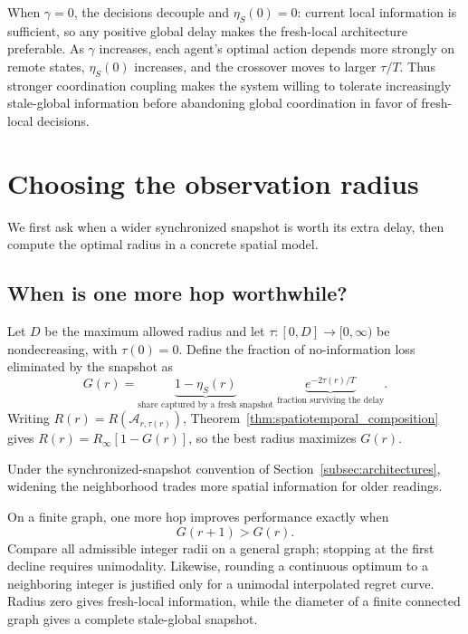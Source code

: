 \documentclass[11pt]{article}
\begin{document}
When $\gamma=0$, the decisions decouple and
$\eta_S(0)=0$: current local information is sufficient, so any
positive global delay makes the fresh-local architecture preferable. As $\gamma$
increases, each agent's optimal action depends more strongly on remote states,
$\eta_S(0)$ increases, and the crossover moves to larger
$\tau/T$. Thus stronger coordination coupling makes the system willing to
tolerate increasingly stale-global information before abandoning global
coordination in favor of fresh-local decisions.

\section{Choosing the observation radius}
\label{sec:optimal_coordination_scale}

We first ask when a wider synchronized snapshot is worth its extra delay,
then compute the optimal radius in a concrete spatial model.

\subsection{When is one more hop worthwhile?}
\label{subsec:radius_dependent_architectures}

Let $D$ be the maximum allowed radius and let
$\tau:[0,D]\to[0,\infty)$ be nondecreasing, with $\tau(0)=0$.
Define the fraction of no-information loss eliminated by the snapshot as
\begin{equation}
G(r)=\underbrace{1-\eta_S(r)}_{\text{share captured by a fresh snapshot}}
     \;\underbrace{e^{-2\tau(r)/T}}_{\text{fraction surviving the delay}}.
\label{eq:snapshot_gain}
\end{equation}
Writing $R(r)=R(\mathcal A_{r,\tau(r)})$,
Theorem~\ref{thm:spatiotemporal_composition} gives
$R(r)=R_\infty[1-G(r)]$, so the best radius maximizes $G(r)$.

Under the synchronized-snapshot convention of Section~\ref{subsec:architectures}, widening the neighborhood trades more spatial information for older readings.

On a finite graph, one more hop improves performance exactly when
\begin{equation}
G(r+1)>G(r).
\label{eq:discrete_radius_improvement}
\end{equation}
Compare all admissible integer radii on a general graph; stopping at the
first decline requires unimodality. Likewise, rounding a continuous optimum
to a neighboring integer is justified only for a unimodal interpolated
regret curve. Radius zero gives fresh-local information, while the diameter
of a finite connected graph gives a complete stale-global snapshot.
\end{document}
